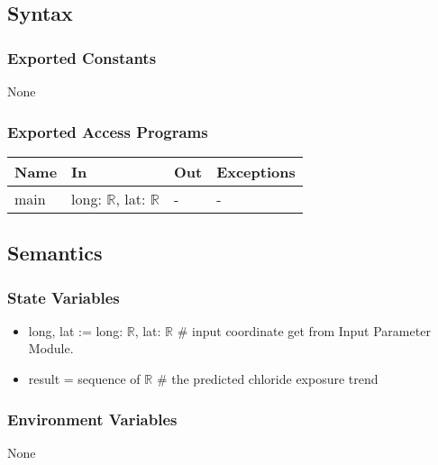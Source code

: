 \documentclass[12pt, titlepage]{article}
\begin{document}
\subsection{Syntax}

\subsubsection{Exported Constants}

None

\subsubsection{Exported Access Programs}

\begin{center}
\begin{tabular}{p{2cm} p{5cm} p{4cm} p{2cm}}
\hline
\textbf{Name} & \textbf{In} & \textbf{Out} & \textbf{Exceptions} \\
\hline
main & long: $\mathbb{R}$, lat: $\mathbb{R}$  & - & - \\
\hline
\end{tabular}
\end{center}

\subsection{Semantics}

\subsubsection{State Variables}
\begin{itemize}
\item long, lat := long: $\mathbb{R}$, lat: $\mathbb{R}$ \# input coordinate get from Input Parameter Module.
\item result = sequence of $\mathbb{R}$ \# the predicted chloride exposure trend

\end{itemize}

\subsubsection{Environment Variables}

None

\end{document}
